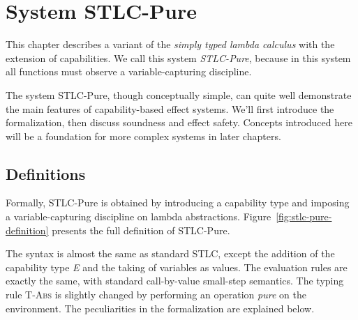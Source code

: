 \section{System STLC-Pure}

This chapter describes a variant of the \emph{simply typed
  lambda calculus} with the extension of capabilities. We call this
system \emph{STLC-Pure}, because in this system all functions must
observe a variable-capturing discipline.


The system STLC-Pure, though conceptually simple, can quite well
demonstrate the main features of capability-based effect
systems. We'll first introduce the formalization, then discuss
soundness and effect safety. Concepts introduced here will be a
foundation for more complex systems in later chapters.

\subsection{Definitions}

Formally, STLC-Pure is obtained by introducing a capability type and
imposing a variable-capturing discipline on lambda abstractions.
Figure~\ref{fig:stlc-pure-definition} presents the full definition of
STLC-Pure.

The syntax is almost the same as standard STLC, except the addition of
the capability type \emph{E} and the taking of variables as
values. The evaluation rules are exactly the same, with standard
call-by-value small-step semantics. The typing rule \textsc{T-Abs} is
slightly changed by performing an operation \emph{pure} on the
environment. The peculiarities in the formalization are explained
below.


